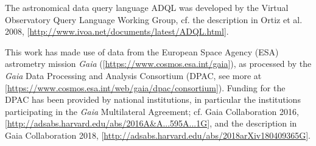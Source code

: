 \documentclass[twocolumn,apj]{openjournal}
\begin{document}
The astronomical data query language ADQL was developed by the Virtual Observatory Query Language Working Group, cf. the description in Ortiz et al. 2008, [\href{http://www.ivoa.net/documents/latest/ADQL.html}{http://www.ivoa.net/documents/latest/ADQL.html}].

This work has made use of data from the European Space Agency (ESA) astrometry mission
{\it Gaia} ([\url{https://www.cosmos.esa.int/gaia}]), as processed by the {\it Gaia}
Data Processing and Analysis Consortium (DPAC, see more at
[\url{https://www.cosmos.esa.int/web/gaia/dpac/consortium}]). Funding for the DPAC
has been provided by national institutions, in particular the institutions
participating in the {\it Gaia} Multilateral Agreement; cf. Gaia Collaboration 2016, [\href{http://adsabs.harvard.edu/abs/2016A&A...595A...1G}{http://adsabs.harvard.edu/abs/2016A\&A...595A...1G}], and the description in Gaia Collaboration 2018, [\href{http://adsabs.harvard.edu/abs/2018arXiv180409365G}{http://adsabs.harvard.edu/abs/2018arXiv180409365G}].
\end{document}
